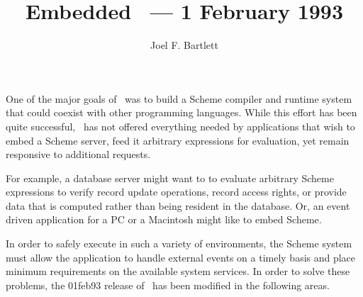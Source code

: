 \documentclass[12pt]{article}
\title{Embedded \StoC\ --- 1 February 1993}
\date{}
\author{Joel F. Bartlett}
\begin{document}
\maketitle

One of the major goals of \StoC\ was to build a Scheme compiler and
runtime system that could coexist with other programming languages.
While this effort has been quite successful, \StoC\ has not offered
everything needed by applications that wish to embed a Scheme server,
feed it arbitrary expressions for evaluation, yet remain responsive to
additional requests.

For example, a database server might want to to evaluate arbitrary
Scheme expressions to verify record update operations, record access
rights, or provide data that is computed rather than being resident in
the database.  Or, an event driven application for a PC or a Macintosh
might like to embed Scheme.

In order to safely execute in such a variety of environments, the
Scheme system must allow the application to handle external events on
a timely basis and place minimum requirements on the available system
services. In order to solve these problems, the 01feb93 release of
\StoC\ has been modified in the following areas.
\end{document}
